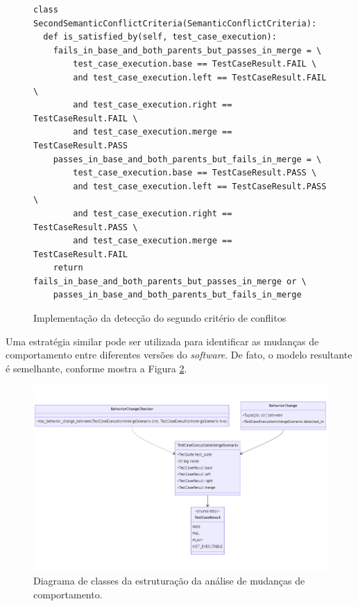 \documentclass[12pt]{article}
\begin{document}
\begin{figure}[H]
\begin{verbatim}
class SecondSemanticConflictCriteria(SemanticConflictCriteria):
  def is_satisfied_by(self, test_case_execution):
    fails_in_base_and_both_parents_but_passes_in_merge = \
        test_case_execution.base == TestCaseResult.FAIL \
        and test_case_execution.left == TestCaseResult.FAIL \
        and test_case_execution.right == TestCaseResult.FAIL \
        and test_case_execution.merge == TestCaseResult.PASS
    passes_in_base_and_both_parents_but_fails_in_merge = \
        test_case_execution.base == TestCaseResult.PASS \
        and test_case_execution.left == TestCaseResult.PASS \
        and test_case_execution.right == TestCaseResult.PASS \
        and test_case_execution.merge == TestCaseResult.FAIL
    return fails_in_base_and_both_parents_but_passes_in_merge or \
    passes_in_base_and_both_parents_but_fails_in_merge
\end{verbatim}
\caption{Implementação da detecção do segundo critério de conflitos}
\label{fig:criteria-python}
\end{figure}

Uma estratégia similar pode ser utilizada para identificar as mudanças de comportamento entre diferentes versões do \textit{software}. De fato, o modelo resultante é semelhante, conforme mostra a Figura \ref{fig:bc}.

\begin{figure}[H]
    \centering
    \includegraphics[width=\textwidth]{imagens/bc.png}
    \caption{Diagrama de classes da estruturação da análise de mudanças de comportamento.}
    \label{fig:bc}
\end{figure}
\end{document}
